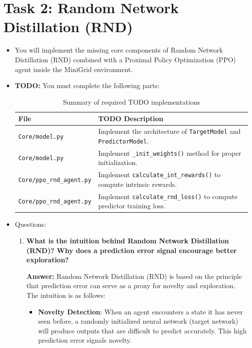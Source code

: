 \documentclass[12pt]{article}
\begin{document}
{{{\section{Task 2: Random Network Distillation (RND)}
\begin{itemize}[noitemsep]
    \item You will implement the missing core components of Random Network Distillation (RND) combined with
a Proximal Policy Optimization (PPO) agent inside the MiniGrid environment.
    \item \textbf{TODO:} You must complete the following parts:
    \begin{table}[h]
    \centering
    \renewcommand{\arraystretch}{1.3}
    \begin{tabular}{ll}
    \toprule
    \textbf{File} & \textbf{TODO Description} \\
    \midrule
    \texttt{Core/model.py} & Implement the architecture of \texttt{TargetModel} and \texttt{PredictorModel}. \\
    \texttt{Core/model.py} & Implement \texttt{\_init\_weights()} method for proper initialization. \\
    \texttt{Core/ppo\_rnd\_agent.py} & Implement \texttt{calculate\_int\_rewards()} to compute intrinsic rewards. \\
    \texttt{Core/ppo\_rnd\_agent.py} & Implement \texttt{calculate\_rnd\_loss()} to compute predictor training loss. \\
    \bottomrule
    \end{tabular}
    \caption{Summary of required TODO implementations}
    \end{table}
    
    \item Questions:
    \begin{enumerate}
    \item \textbf{What is the intuition behind Random Network Distillation (RND)? Why does a prediction error signal encourage better exploration?}
    
    \textbf{Answer:} Random Network Distillation (RND) is based on the principle that prediction error can serve as a proxy for novelty and exploration. The intuition is as follows:
    
    \begin{itemize}
        \item \textbf{Novelty Detection}: When an agent encounters a state it has never seen before, a randomly initialized neural network (target network) will produce outputs that are difficult to predict accurately. This high prediction error signals novelty.
        

\end{itemize}
\end{enumerate}
\end{itemize}}}}
\end{document}
